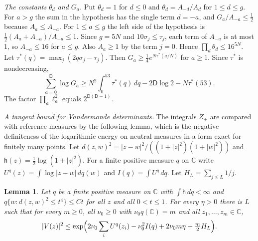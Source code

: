 \documentclass[11pt]{amsart}
\newtheorem{lemma}[theorem]{Lemma}
\theoremstyle{definition}
\theoremstyle{remark}
\numberwithin{equation}{section}
\newcommand{\C}{\mathbb C}
\begin{document}
\emph{The constants $\theta_d$ and $G_a$.} Put $\theta_d=1$ for $d\le0$ and $\theta_d=A_{-d}/A_d$ for $1\le d\le g$. For $a>g$ the
sum in the hypothesis has the single term $d=-a$, and $G_a/A_{-a}\le\frac12$ because $A_a\le A_{-a}$. For $1\le a\le g$
the left side of the hypothesis is $\frac12(A_a+A_{-a})/A_{-a}\le1$. Since $g=5N$ and $10\sigma_j\le\tau_j$, each term of $A_{-a}$ is at
most $1$, so $A_{-a}\le16$ for $a\le g$. Also $A_a\ge1$ by the term $j=0$. Hence $\prod_d\theta_d\le16^{5N}$. Let
$\tau^*(q)=\max_j(2q\sigma_j-\tau_j)$. Then $G_a\ge\frac14e^{N\tau^*(a/N)}$ for $a\ge1$. Since $\tau^*$ is nondecreasing,
\begin{equation}\label{eq:legendre}
 \sum_{a=0}^{\mathsf D}\log G_a\ge N^2\int_0^{53}\tau^*(q)\,dq-2\mathsf D\log2-N\tau^*(53).
\end{equation}
The factor $\prod_a\ell_a^2$ equals $2^{\mathsf D(\mathsf D-1)}$.

\emph{A tangent bound for Vandermonde determinants.} The integrals $Z_\pm$ are compared with reference measures by the
following lemma, which is the negative definiteness of the logarithmic energy on neutral measures in a form exact
for finitely many points. Let $d(z,w)^2=|z-w|^2/((1+|z|^2)(1+|w|^2))$ and $\mathsf h(z)=\frac12\log(1+|z|^2)$. For a finite positive measure $q$ on
$\C$ write $U^q(z)=\int\log|z-w|\,dq(w)$ and $I(q)=\int U^q\,dq$. Let $H_L=\sum_{j\le L}1/j$.

\begin{lemma}\label{lem:tangent}
Let $q$ be a finite positive measure on $\C$ with $\int\mathsf h\,dq<\infty$ and $q\{w:d(z,w)^2\le t^4\}\le Ct$ for all $z$ and all
$0<t\le1$. For every $\eta>0$ there is $L$ such that for every $m\ge0$, all $\nu_0\ge0$ with $\nu_0q(\C)=m$ and all
$z_1,\ldots,z_m\in\C$,
\[
 |V(z)|^2\le\exp\Bigl(2\nu_0\sum_iU^q(z_i)-\nu_0^2I(q)+2\nu_0m\eta+\tfrac m2H_L\Bigr).
\]
\end{lemma}
\end{document}
